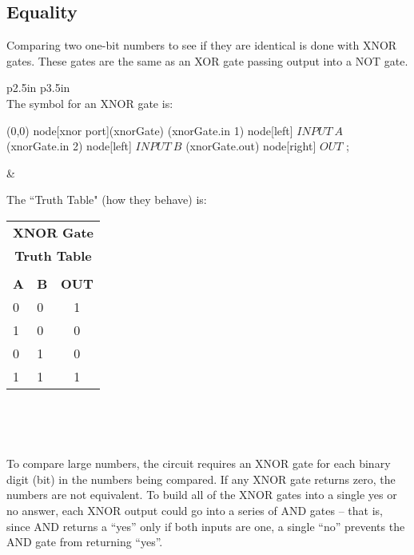 \clearpage

\subsection*{Equality}

Comparing two one-bit numbers to see if they are identical is done with XNOR gates. These gates are the same as an XOR gate passing output into a NOT gate. 

\medskip
\begin{center}

\begin{tabular}{p{2.5in} p{3.5in} }
\hline\\[\negsep]

The symbol for an XNOR gate is:

\vspace{0.25in}

\begin{circuitikz}
\draw
	(0,0) node[xnor port](xnorGate) {}
	(xnorGate.in 1) node[left] {{\color{red}$INPUT~A$}}
	(xnorGate.in 2) node[left] {{\color{red}$INPUT~B$}}
	(xnorGate.out) node[right] {{\color{red}$OUT$}}
;
\end{circuitikz}

&

\centering

The ``Truth Table" (how they behave) is: 
\vspace{0.15in}

\begin{tabular}{ll | c}
\multicolumn{3}{c}{\textbf{XNOR Gate }}\\
\multicolumn{3}{c}{\textbf{Truth Table}}\\
\hline\\[\negsep]
\textbf{A} & \textbf{B} & \textbf{OUT}\\
\hline
0 & 0 & 1  \\
1 & 0 & 0  \\
0 & 1 & 0  \\
1 & 1 & 1  \\
\hline
\end{tabular}
\\
\tabularnewline

\hline\\[\negsep]

\end{tabular}
\end{center}

\bigskip

To compare large numbers, the circuit requires an XNOR gate for each binary digit (bit) in the numbers being compared. If any XNOR gate returns zero, the numbers are not equivalent. To build all of the XNOR gates into a single yes or no answer, each XNOR output could go into a series of AND gates -- that is, since AND returns a ``yes'' only if both inputs are one, a single ``no'' prevents the AND gate from returning ``yes''. 


